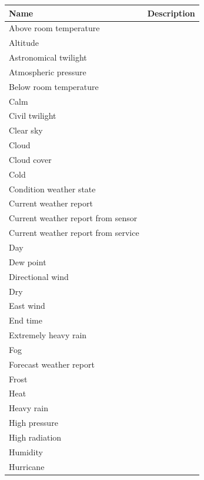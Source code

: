 \begin{longtable}{|p{}|p{}|}
  \hline
  \textbf{Name} & \textbf{Description} \\
  \hline\hline
  Above room temperature & \\
  \hline
  Altitude & \\
  \hline
  Astronomical twilight & \\
  \hline
  Atmospheric pressure & \\
  \hline
  Below room temperature & \\
  \hline
  Calm & \\
  \hline
  Civil twilight & \\
  \hline
  Clear sky & \\
  \hline
  Cloud & \\
  \hline
  Cloud cover & \\
  \hline
  Cold & \\
  \hline
  Condition weather state & \\
  \hline
  Current weather report & \\
  \hline
  Current weather report from sensor & \\
  \hline
  Current weather report from service & \\
  \hline
  Day & \\
  \hline
  Dew point & \\
  \hline
  Directional wind & \\
  \hline
  Dry & \\
  \hline
  East wind & \\
  \hline
  End time & \\
  \hline
  Extremely heavy rain & \\
  \hline
  Fog & \\
  \hline
  Forecast weather report & \\
  \hline
  Frost & \\
  \hline
  Heat & \\
  \hline
  Heavy rain & \\
  \hline
  High pressure & \\
  \hline
  High radiation & \\
  \hline
  Humidity & \\
  \hline
  Hurricane & \\

\end{longtable}
